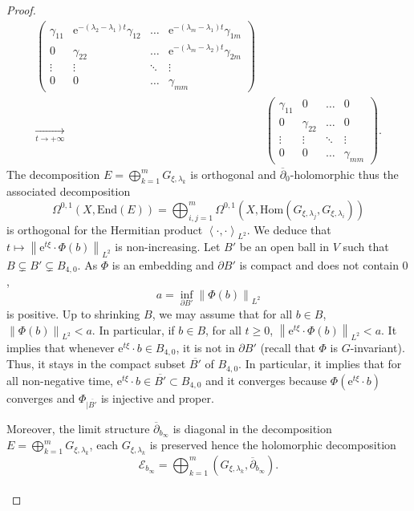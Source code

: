 \documentclass{article}
\theoremstyle{remark}
\theoremstyle{definition}
\newcommand{\tend}[2]{\underset{#1 \rightarrow #2}{\longrightarrow}}
\newcommand{\Hom}{\mathrm{Hom}}
\newcommand{\End}{\mathrm{End}}
\newcommand{\e}{\boldsymbol{\mathrm{e}}}
\newcommand{\scal}[2]{\left< #1,#2 \right>}
\newcommand{\norme}[1]{\left\| #1 \right\|}
\newcommand{\E}{\mathcal{E}}
\newcommand{\dbar}{\overline{\partial}}
\renewcommand{\geq}{\geqslant}
\begin{document}
\begin{proof}
\begin{align*}
\begin{pmatrix}
        \gamma_{11} & \e^{-(\lambda_2 - \lambda_1)t}\gamma_{12} & \hdots & \e^{-(\lambda_m - \lambda_1)t}\gamma_{1m}\\
        0 & \gamma_{22} & \hdots & \e^{-(\lambda_m - \lambda_2)t}\gamma_{2m}\\
        \vdots & \vdots & \ddots & \vdots\\
        0 & 0 & \hdots & \gamma_{mm}
    \end{pmatrix}\\
    \tend{t}{+\infty}\ &
    \begin{pmatrix}
        \gamma_{11} & 0 & \hdots & 0\\
        0 & \gamma_{22} & \hdots & 0\\
        \vdots & \vdots & \ddots & \vdots\\
        0 & 0 & \hdots & \gamma_{mm}
    \end{pmatrix}.
\end{align*}
The decomposition $E = \bigoplus_{k = 1}^m G_{\xi,\lambda_k}$ is orthogonal and $\dbar_0$-holomorphic thus the associated decomposition
$$
\Omega^{0,1}(X,\End(E)) = \bigoplus_{i,j = 1}^m \Omega^{0,1}(X,\Hom(G_{\xi,\lambda_j},G_{\xi,\lambda_i}))
$$
is orthogonal for the Hermitian product $\scal{\cdot}{\cdot}_{L^2}$. We deduce that $t \mapsto \norme{\e^{t\xi} \cdot \Phi(b)}_{L^2}$ is non-increasing. Let $B'$ be an open ball in $V$ such that $B \subsetneq B' \subsetneq B_{4,0}$. As $\Phi$ is an embedding and $\partial B'$ is compact and does not contain $0$,
$$
a = \inf_{\partial B'} \norme{\Phi(b)}_{L^2}
$$
is positive. Up to shrinking $B$, we may assume that for all $b \in B$, $\norme{\Phi(b)}_{L^2} < a$. In particular, if $b \in B$, for all $t \geq 0$, $\norme{\e^{t\xi} \cdot \Phi(b)}_{L^2} < a$. It implies that whenever $\e^{t\xi} \cdot b \in B_{4,0}$, it is not in $\partial B'$ (recall that $\Phi$ is $G$-invariant). Thus, it stays in the compact subset $\overline{B'}$ of $B_{4,0}$. In particular, it implies that for all non-negative time, $\e^{t\xi} \cdot b \in \overline{B'} \subset B_{4,0}$ and it converges because $\Phi(\e^{t\xi} \cdot b)$ converges and $\Phi_{|\overline{B'}}$ is injective and proper.

Moreover, the limit structure $\dbar_{b_\infty}$ is diagonal in the decomposition $E = \bigoplus_{k = 1}^m G_{\xi,\lambda_k}$, each $G_{\xi,\lambda_k}$ is preserved hence the holomorphic decomposition
$$
\E_{b_\infty} = \bigoplus_{k = 1}^m (G_{\xi,\lambda_k},\dbar_{b_\infty}).
$$\\


\end{proof}
\end{document}
